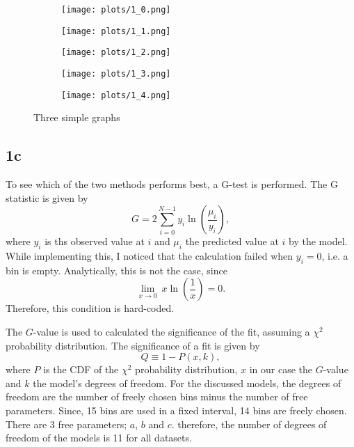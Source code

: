 \newpage

\begin{figure}[h!]
    \centering
    \begin{subfigure}[b]{0.4\textwidth}
        \centering
        \texttt{[image: plots/1\_0.png]}
        \caption{}
        \label{fig:1_0}
    \end{subfigure}
    \begin{subfigure}[b]{0.4\textwidth}
        \centering
        \texttt{[image: plots/1\_1.png]}
        \caption{}
        \label{fig:1_1}
    \end{subfigure}
    \begin{subfigure}[b]{0.4\textwidth}
        \centering
        \texttt{[image: plots/1\_2.png]}
        \caption{}
        \label{fig:1_2}
    \end{subfigure}
    \begin{subfigure}[b]{0.4\textwidth}
        \centering
        \texttt{[image: plots/1\_3.png]}
        \caption{}
        \label{fig:1_3}
    \end{subfigure}
    \begin{subfigure}[b]{0.4\textwidth}
        \centering
        \texttt{[image: plots/1\_4.png]}
        \caption{}
        \label{fig:1_4}
    \end{subfigure}
       \caption{Three simple graphs}
       \label{fig:1}
\end{figure}

\subsection*{1c}
To see which of the two methods performs best, a G-test is performed. The G statistic is given by
\begin{equation}
    G=2 \sum_{i=0}^{N-1} y_i\ln\left(\frac{\mu_i}{y_i}\right),
\end{equation}
where $y_i$ is ths observed value at $i$ and $\mu_i$ the predicted value at $i$ by the model. While implementing this, I noticed that the calculation failed when $y_i=0$, i.e. a bin is empty. Analytically, this is not the case, since
\begin{equation}
    \lim_{x \to 0} \  x\ln\left(\frac{1}{x}\right) = 0.
\end{equation}
Therefore, this condition is hard-coded.

The $G$-value is used to calculated the significance of the fit, assuming a $\chi^2$ probability distribution. The significance of a fit is given by
\begin{equation}
    Q \equiv 1 - P(x,k),
\end{equation}
where $P$ is the CDF of the $\chi^2$ probability distribution, $x$ in our case the $G$-value and $k$ the model's degrees of freedom. For the discussed models, the degrees of freedom are the number of freely chosen bins minus the number of free parameters. Since, 15 bins are used in a fixed interval, 14 bins are freely chosen. There are 3 free parameters; $a$, $b$ and $c$. therefore, the number of degrees of freedom of the models is 11 for all datasets. 

